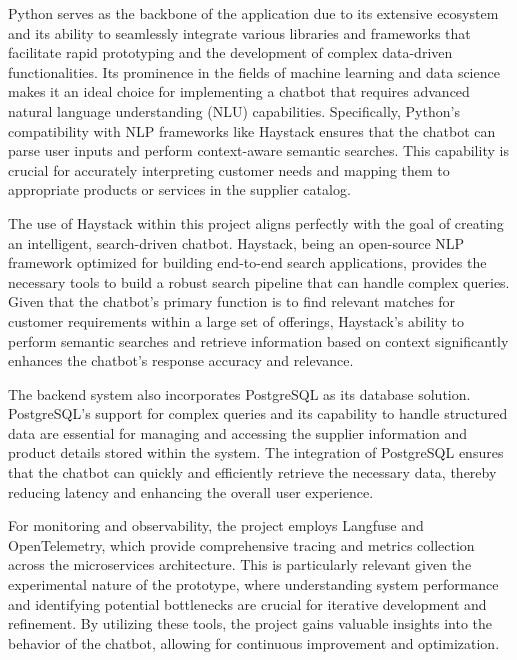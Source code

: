 
Python serves as the backbone of the application due to its extensive ecosystem and its ability to seamlessly integrate
various libraries and frameworks that facilitate rapid prototyping and the development of complex data-driven
functionalities.
Its prominence in the fields of machine learning and data science makes it an ideal choice for
implementing a chatbot that requires advanced natural language understanding (NLU) capabilities.
Specifically, Python's
compatibility with NLP frameworks like Haystack ensures that the chatbot can parse user inputs and perform context-aware
semantic searches.
This capability is crucial for accurately interpreting customer needs and mapping them to appropriate
products or services in the supplier catalog.

The use of Haystack within this project aligns perfectly with the goal of creating an intelligent, search-driven
chatbot.
Haystack, being an open-source NLP framework optimized for building end-to-end search applications, provides
the necessary tools to build a robust search pipeline that can handle complex queries.
Given that the chatbot’s primary
function is to find relevant matches for customer requirements within a large set of offerings, Haystack’s ability to
perform semantic searches and retrieve information based on context significantly enhances the chatbot’s response
accuracy and relevance.


The backend system also incorporates PostgreSQL as its database solution.
PostgreSQL’s support for complex queries and
its capability to handle structured data are essential for managing and accessing the supplier information and product
details stored within the system.
The integration of PostgreSQL ensures that the chatbot can quickly and efficiently
retrieve the necessary data, thereby reducing latency and enhancing the overall user experience.


For monitoring and observability, the project employs Langfuse and OpenTelemetry, which provide comprehensive tracing
and metrics collection across the microservices architecture.
This is particularly relevant given the experimental
nature of the prototype, where understanding system performance and identifying potential bottlenecks are crucial for
iterative development and refinement.
By utilizing these tools, the project gains valuable insights into the behavior of
the chatbot, allowing for continuous improvement and optimization.

